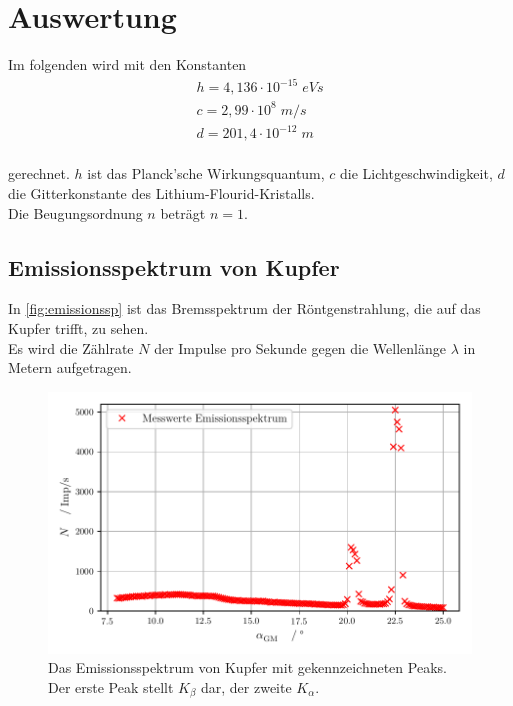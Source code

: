 \section{Auswertung}
\label{sec:Auswertung}

Im folgenden wird mit den Konstanten 
\begin{align*}
  h = 4,136 \cdot 10^{-15} \; eVs\\
  c = 2,99 \cdot 10^8 \; m/s \\
  d = 201,4 \cdot 10^{-12}\; m \\
\end{align*}

gerechnet. $h$ ist das Planck'sche Wirkungsquantum, $c$ die Lichtgeschwindigkeit,
$d$ die Gitterkonstante des Lithium-Flourid-Kristalls.\\
Die Beugungsordnung $n$ beträgt $n = 1$.




\subsection{Emissionsspektrum von Kupfer}
\label{subsec:spektrumCU}


In \autoref{fig:emissionssp} ist das Bremsspektrum der Röntgenstrahlung, die auf das Kupfer trifft, zu sehen.\\
Es wird die Zählrate $N$ der Impulse pro Sekunde gegen die Wellenlänge $\lambda$ in Metern aufgetragen.\\

\begin{figure}
  \centering
  \includegraphics{build/emissionsspektrum.pdf}
  \caption{Das Emissionsspektrum von Kupfer mit gekennzeichneten Peaks. Der erste Peak stellt $K_{\beta}$ dar, der zweite $K_{\alpha}$.}
  \label{fig:emissionssp}
\end{figure}

